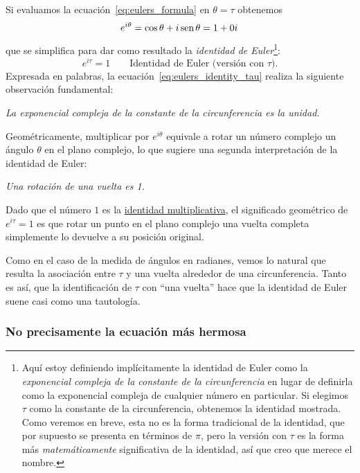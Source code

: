 Si evaluamos la ecuación~\eqref{eq:eulers_formula} en $\theta = \tau$ obtenemos 
\begin{equation}
\label{eq:eulers_identity_tau_0i}
  e^{i\theta} = \cos\theta + i\,\mbox{sen}\,\theta = 1 + 0i\,
\end{equation}
que se simplifica para dar como resultado la \emph{identidad de Euler}\footnote{Aquí estoy definiendo implícitamente la identidad de Euler como la \emph{exponencial compleja de la constante de la circunferencia} en lugar de definirla como la exponencial compleja de cualquier número en particular. Si elegimos  $\tau$ como la constante de la circunferencia, obtenemos la identidad mostrada. Como veremos en breve, esta no es la forma tradicional de la identidad, que por supuesto se presenta en términos de $\pi$, pero la versión con  $\tau$ es la forma más  \emph{matemáticamente} significativa de la identidad, así que creo que merece el nombre.}:
\begin{equation}
\label{eq:eulers_identity_tau}
e^{i\tau} = 1 \qquad\mbox{Identidad de Euler (versión con $\tau$).}
\end{equation}
Expresada en palabras, la ecuación~\eqref{eq:eulers_identity_tau} realiza la siguiente observación fundamental:

\begin{center}
\emph{La exponencial compleja de la constante de la circunferencia es la unidad.} 
\end{center}

Geométricamente, multiplicar por $e^{i\theta}$ equivale a rotar un número complejo un ángulo $\theta$ en el plano complejo, lo que sugiere una segunda interpretación de la identidad de Euler:

\begin{center}
\emph{Una rotación de una vuelta es 1.}
\end{center}


\noindent Dado que el número $1$ es la \href{https://es.wikipedia.org/wiki/Elemento_neutro}{identidad multiplicativa}, el significado geométrico de $e^{i\tau} = 1$ es que rotar un punto en el plano complejo una vuelta completa simplemente lo devuelve a su posición original.

Como en el caso de la medida de ángulos en radianes, vemos lo natural que resulta la asociación entre $\tau$ y una vuelta alrededor de una circunferencia. Tanto es así, que la identificación de $\tau$ con ``una vuelta'' hace que la identidad de Euler suene casi como una tautología.


    \subsubsection{No precisamente la ecuación más hermosa} %
    \label{sec:not_the_most_beautiful_equation}


